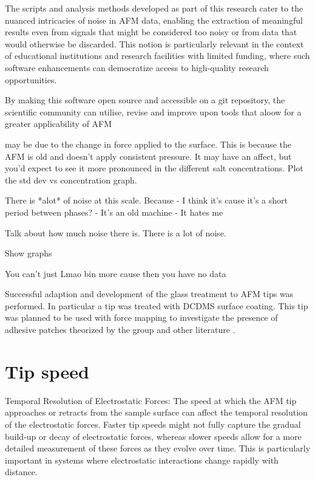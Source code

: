 The scripts and analysis methods developed as part of this research cater to the nuanced intricacies of noise in AFM data, enabling the extraction of meaningful results even from signals that might be considered too noisy or from data that would otherwise be discarded. This notion is particularly relevant in the context of educational institutions and research facilities with limited funding, where such software enhancements can democratize access to high-quality research opportunities. 

By making this software open source and accessible on a git repository, the scientific community can utilise, revise and improve upon tools that aloow for a greater applicability of AFM\cite{YourGithub2023}

may be due to the change in force applied to the surface. This is because the AFM is old and doesn't apply consistent pressure. It may have an affect, but you'd expect to see it more pronounced in the different salt concentrations. Plot the std dev vs concentration graph.

There is *alot* of noise at this scale. Because 
- I think it's cause it's a short period between phases?
- It's an old machine
- It hates me

Talk about how much noise there is. There is a lot of noise.

Show graphs

You can't just Lmao bin more cause then you have no data




Successful adaption and development of the glass treatment to AFM tips was performed. In particular a tip was treated with DCDMS surface coating. This tip was planned to be used with force mapping to investigate the presence of adhesive patches theorized by the group \cite{Teun1} and other literature \cite{Patchy}. 

\section{Tip speed}
Temporal Resolution of Electrostatic Forces: The speed at which the AFM tip approaches or retracts from the sample surface can affect the temporal resolution of the electrostatic forces. Faster tip speeds might not fully capture the gradual build-up or decay of electrostatic forces, whereas slower speeds allow for a more detailed measurement of these forces as they evolve over time. This is particularly important in systems where electrostatic interactions change rapidly with distance.

